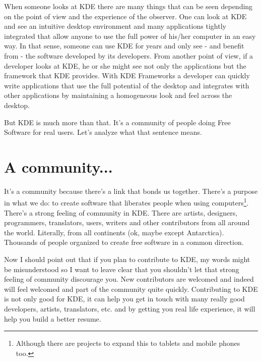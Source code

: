 
\noindent{}When someone looks at KDE there are many things that can be seen depending on the point of view and the experience of the observer. One can look at KDE and see an intuitive desktop environment and many applications tightly integrated that allow anyone to use the full power of his/her computer in an easy way. In that sense, someone can use KDE for years and only see - and benefit from - the software developed by its developers. From another point of view, if a developer looks at KDE, he or she might see not only the applications but the framework that KDE provides. With KDE Frameworks a developer can quickly write applications that use the full potential of the desktop and integrates with other applications by maintaining a homogeneous look and feel across the desktop. 

But KDE is much more than that. It's a community of people doing Free Software for real users. Let's analyze what that sentence means.

\section*{A community...}
It's a community because there's a link that bonds us together. There's a purpose in what we do: to create software that liberates people when using computers\footnote{Although there are projects to expand this to tablets and mobile phones too.}. There's a strong feeling of community in KDE. There are artists, designers, programmers, translators, users, writers and other contributors from all around the world. Literally, from all continents (ok, maybe except Antarctica). Thousands of people organized to create free software in a common direction.

Now I should point out that if you plan to contribute to KDE, my words might be misunderstood so I want to leave clear that you shouldn't let that strong feeling of community discourage you. New contributors are welcomed and indeed will feel welcomed and part of the community quite quickly. Contributing to KDE is not only good for KDE, it can help you get in touch with many really good developers, artists, translators, etc. and by getting you real life experience, it will help you build a better resume.

